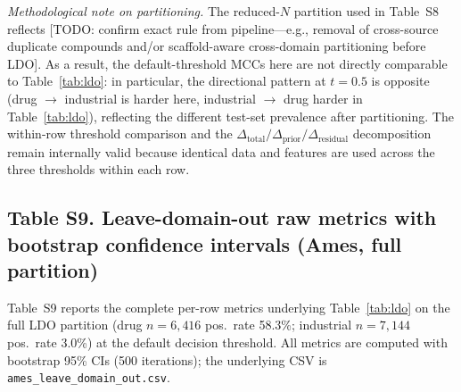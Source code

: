 \textit{Methodological note on partitioning.} The reduced-$N$ partition used in Table~S8 
reflects [TODO: confirm exact rule from pipeline---e.g., removal of cross-source duplicate 
compounds and/or scaffold-aware cross-domain partitioning before LDO]. As a result, the 
default-threshold MCCs here are not directly comparable to Table~\ref{tab:ldo}: in particular, 
the directional pattern at $t = 0.5$ is opposite (drug $\to$ industrial is harder here, 
industrial $\to$ drug harder in Table~\ref{tab:ldo}), reflecting the different test-set 
prevalence after partitioning. The within-row threshold comparison and the 
$\Delta_{\mathrm{total}}/\Delta_{\mathrm{prior}}/\Delta_{\mathrm{residual}}$ decomposition 
remain internally valid because identical data and features are used across the three 
thresholds within each row.


\subsection*{Table S9. Leave-domain-out raw metrics with bootstrap confidence intervals (Ames, full partition)}

Table~S9 reports the complete per-row metrics underlying Table~\ref{tab:ldo} on the full 
LDO partition (drug $n=6{,}416$ pos.\ rate 58.3\%; industrial $n=7{,}144$ pos.\ rate 3.0\%) 
at the default decision threshold. All metrics are computed with bootstrap 95\% CIs (500 
iterations); the underlying CSV is \texttt{ames\_leave\_domain\_out.csv}.

